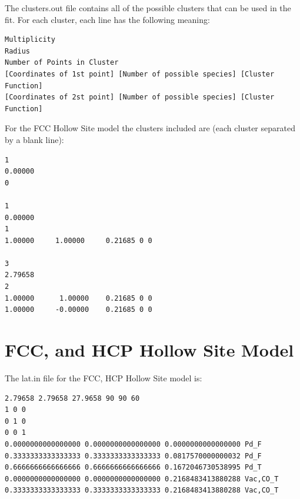 \documentclass[11pt]{article}
\begin{document}
The clusters.out file contains all of the possible clusters that can be used in the fit. For each cluster, each line has the following meaning:
\begin{verbatim}
Multiplicity
Radius
Number of Points in Cluster
[Coordinates of 1st point] [Number of possible species] [Cluster Function]
[Coordinates of 2st point] [Number of possible species] [Cluster Function]
\end{verbatim}

For the FCC Hollow Site model the clusters included are (each cluster separated by a blank line):
\begin{verbatim}
1
0.00000
0

1
0.00000
1
1.00000     1.00000     0.21685 0 0

3
2.79658
2
1.00000      1.00000    0.21685 0 0
1.00000     -0.00000    0.21685 0 0
\end{verbatim}

\clearpage
\section{FCC, and HCP Hollow Site Model} \label{FCCHCPSiteCE}

The lat.in file for the FCC, HCP Hollow Site model is:
\begin{verbatim}
2.79658 2.79658 27.9658 90 90 60
1 0 0
0 1 0
0 0 1
0.0000000000000000 0.0000000000000000 0.0000000000000000 Pd_F
0.3333333333333333 0.3333333333333333 0.0817570000000032 Pd_F
0.6666666666666666 0.6666666666666666 0.1672046730538995 Pd_T
0.0000000000000000 0.0000000000000000 0.2168483413880288 Vac,CO_T
0.3333333333333333 0.3333333333333333 0.2168483413880288 Vac,CO_T
\end{verbatim}
\end{document}
